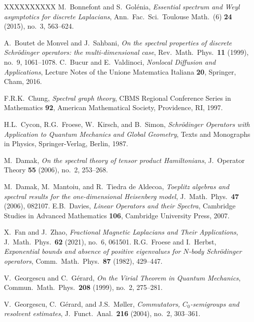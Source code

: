 \documentclass[10pt]{amsart} %
\newcommand{\1}{{\mathbb{I}}}
\numberwithin{equation}{section}
\begin{document}
\begin{thebibliography}{XXXXXXXXXX}
 M.\ Bonnefont and S.\ Gol\'enia, \emph{Essential spectrum and Weyl asymptotics for discrete Laplacians}, Ann.\ Fac.\ Sci.\ Toulouse Math.\ (6) {\bf 24} (2015), no.\ 3, 563--624.

 A.\ Boutet de Monvel and J.\ Sahbani, \emph{On the spectral properties of discrete Schr\"odinger operators: the multi-dimensional case}, Rev.\ Math.\ Phys.\ {\bf 11} (1999), no.\ 9, 1061--1078.
 C.\ Bucur and E.\ Valdinoci, \emph{Nonlocal Diffusion and Applications}, Lecture Notes of the Unione Matematica Italiana {\bf 20}, Springer, Cham, 2016.

 F.R.K.\ Chung, \emph{Spectral graph theory}, CBMS Regional Conference Series in Mathematics {\bf 92}, American Mathematical Society, Providence, RI, 1997.

 H.L.\ Cycon, R.G.\ Froese, W.\ Kirsch, and B.\ Simon, \emph{Schr\"odinger Operators with Application to Quantum Mechanics and Global Geometry}, Texts and Monographs in Physics, Springer-Verlag, Berlin, 1987.


 M.\ Damak, \emph{On the spectral theory of tensor product Hamiltonians}, J.\ Operator Theory {\bf 55} (2006), no.\ 2, 253--268.

 M.\ Damak, M.\ Mantoiu, and R.\ Tiedra de Aldecoa, \emph{Toeplitz algebras and spectral results for the one-dimensional Heisenberg model}, J.\ Math.\ Phys.\ {\bf 47} (2006), 082107.
     E.B.\ Davies, \emph{Linear Operators and their Spectra}, Cambridge Studies in Advanced Mathematics {\bf 106}, Cambridge University Press, 2007.

 X.\ Fan and J.\ Zhao, \emph{Fractional Magnetic Laplacians and Their Applications}, J.\ Math.\ Phys.\ {\bf 62} (2021), no.\ 6, 061501.
 R.G.\ Froese and I.\ Herbst, \emph{Exponential bounds and absence of positive eigenvalues for $N$-body Schr\"odinger operators}, Comm.\ Math.\ Phys.\ {\bf 87} (1982), 429--447.

 V.\ Georgescu and C.\ G\'erard, \emph{On the Virial Theorem in Quantum Mechanics}, Commun.\ Math.\ Phys.\ {\bf 208} (1999), no.\ 2, 275--281.

 V.\ Georgescu, C.\ G\'erard, and J.S.\ M\o ller, \emph{Commutators, $C_0$-semigroups and resolvent estimates}, J.\ Funct.\ Anal.\ {\bf 216} (2004), no.\ 2, 303--361.


\end{thebibliography}
\end{document}
